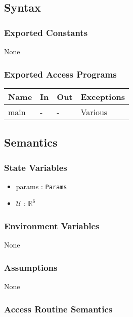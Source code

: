 \documentclass[12pt, titlepage]{article}
\begin{document}
\subsection{Syntax}

\subsubsection{Exported Constants}
None 
\subsubsection{Exported Access Programs}
\begin{center}
\begin{tabular}{p{3cm} p{4cm} p{4cm} p{3cm}}
\hline
\textbf{Name} & \textbf{In} & \textbf{Out} & \textbf{Exceptions} \\
\hline
main & - & - & Various \\
\hline
\end{tabular}
\end{center}

\subsection{Semantics}

\subsubsection{State Variables}
\begin{itemize}
  \item params : \texttt{Params}
  \item $\mathcal{U}$ : $\mathbb{R}^6$
\end{itemize}

\subsubsection{Environment Variables}
None 

\subsubsection{Assumptions}
None 

\subsubsection{Access Routine Semantics}
\end{document}
